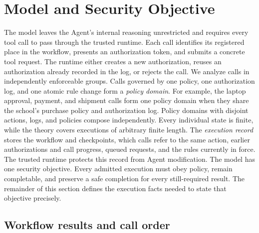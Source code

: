 \section{Model and Security Objective}
\label{sec:model}

The model leaves the Agent's internal reasoning unrestricted and requires every tool call to pass through the trusted runtime.
Each call identifies its registered place in the workflow, presents an authorization token, and submits a concrete tool request.
The runtime either creates a new authorization, reuses an authorization already recorded in the log, or rejects the call.
We analyze calls in independently enforceable groups.
Calls governed by one policy, one authorization log, and one atomic rule change form a \emph{policy domain}.
For example, the laptop approval, payment, and shipment calls form one policy domain when they share the school's purchase policy and authorization log.
Policy domains with disjoint actions, logs, and policies compose independently.
Every individual state is finite, while the theory covers executions of arbitrary finite length.
The \emph{execution record} stores the workflow and checkpoints, which calls refer to the same action, earlier authorizations and call progress, queued requests, and the rules currently in force.
The trusted runtime protects this record from Agent modification.
The model has one security objective.
Every admitted execution must obey policy, remain completable, and preserve a safe completion for every still-required result.
The remainder of this section defines the execution facts needed to state that objective precisely.

\subsection{Workflow results and call order}

